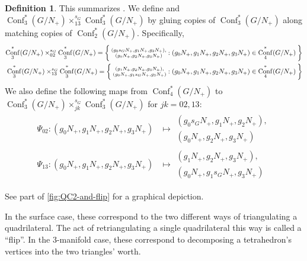 \documentclass{amsart}
\theoremstyle{plain}
\theoremstyle{definition}
\newtheorem{definition}[theorem]{Definition}
\theoremstyle{remark}
\DeclareMathOperator{\Conf}{Conf}
\begin{document}
  \begin{definition}
    \label{def:gluing-configurations}
    This summarizes \cite[Section~2.2.1]{zickert2016}. We define and
    $\Conf_3^{\ast}(G/N_{+}) \times_{13}^{s_G} \Conf_3^{\ast}(G/N_{+})$
    by gluing copies of $\Conf_3^{\ast}(G/N_{+})$ along matching copies
    of $\Conf_2^{\ast}(G/N_{+})$. Specifically,
    \begin{align*}
      \Conf_3^{\ast}(G/N_{+}) \times_{02}^{s_G} \Conf_3^{\ast}(G/N_{+}) = \Set{ \substack{(g_0 s_G N_{+}, g_1 N_{+}, g_2 N_{+}),\\ (g_0 N_{+}, g_2 N_{+}, g_3 N_{+})} : (g_0 N_{+}, g_1 N_{+}, g_2 N_{+}, g_3 N_{+}) \in \Conf_4^{\ast}(G/N_{+}) } \\
      \Conf_3^{\ast}(G/N_{+}) \times_{13}^{s_G} \Conf_3^{\ast}(G/N_{+}) = \Set{ \substack{(g_1 N_{+}, g_2 N_{+}, g_3 N_{+}),\\ (g_0 N_{+}, g_1 s_G N_{+}, g_3 N_{+})} : (g_0 N_{+}, g_1 N_{+}, g_2 N_{+}, g_3 N_{+}) \in \Conf_4^{\ast}(G/N_{+}) } \\
    \end{align*}
    We also define the following maps from $\Conf_4^{\ast}(G/N_{+})$ to
    $\Conf_{3}^{\ast}(G/N_{+}) \times_{jk}^{s_G}
    \Conf_3^{\ast}(G/N_{+})$ for $jk = 02, 13$:
    \begin{align*}
      \Psi_{02} : (g_0 N_{+}, g_1 N_{+}, g_2 N_{+}, g_3 N_{+}) &\mapsto \substack{(g_0 s_G N_{+}, g_1 N_{+}, g_2 N_{+}),\\ (g_0 N_{+}, g_2 N_{+}, g_3 N_{+})} \\
      \Psi_{13} : (g_0 N_{+}, g_1 N_{+}, g_2 N_{+}, g_3 N_{+}) &\mapsto \substack{(g_1 N_{+}, g_2 N_{+}, g_3 N_{+}),\\ (g_0 N_{+}, g_1 s_G N_{+}, g_3 N_{+})}
    \end{align*}

    See part of \cref{fig:QC2-and-flip} for a graphical depiction.

    In the surface case, these correspond to the two different ways of
    triangulating a quadrilateral. The act of retriangulating a single
    quadrilateral this way is called a ``flip''. In the $3$-manifold
    case, these correspond to decomposing a tetrahedron's vertices into
    the two triangles' worth.
  \end{definition}
\end{document}
